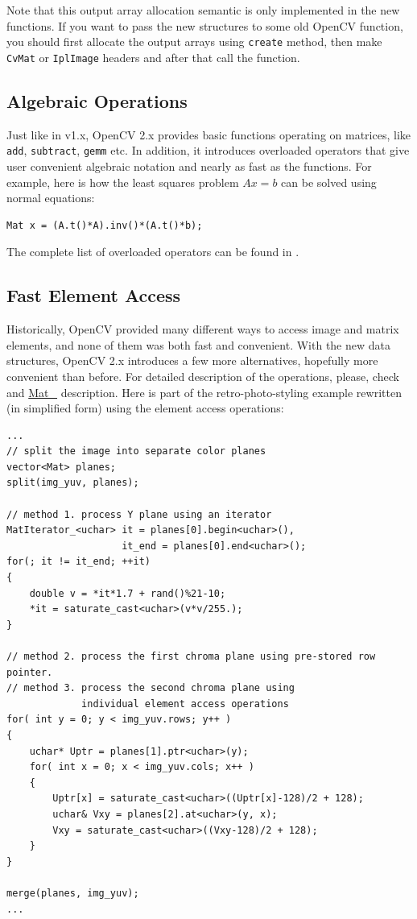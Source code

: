 Note that this output array allocation semantic is only implemented in the new functions. If you want to pass the new structures to some old OpenCV function, you should first allocate the output arrays using \texttt{create} method, then make \texttt{CvMat} or \texttt{IplImage} headers and after that call the function.

\subsection{Algebraic Operations}

Just like in v1.x, OpenCV 2.x provides basic functions operating on matrices, like \texttt{add},
\texttt{subtract}, \texttt{gemm} etc. In addition, it introduces overloaded operators that give user convenient
algebraic notation and nearly as fast as the functions. For example, here is how the least squares problem $Ax=b$
can be solved using normal equations:
\begin{lstlisting}
Mat x = (A.t()*A).inv()*(A.t()*b);
\end{lstlisting}

The complete list of overloaded operators can be found in .

\subsection{Fast Element Access}

Historically, OpenCV provided many different ways to access image and matrix elements, and none of them was both fast and convenient.
With the new data structures, OpenCV 2.x introduces a few more alternatives, hopefully more convenient than before. For detailed description of the operations, please, check  and \href{#MatT}{Mat\_} description. Here is part of the retro-photo-styling example rewritten (in simplified form) using the element access operations:

\begin{lstlisting}
...
// split the image into separate color planes
vector<Mat> planes;
split(img_yuv, planes);

// method 1. process Y plane using an iterator
MatIterator_<uchar> it = planes[0].begin<uchar>(),
                    it_end = planes[0].end<uchar>();
for(; it != it_end; ++it)
{
    double v = *it*1.7 + rand()%21-10;
    *it = saturate_cast<uchar>(v*v/255.);
}

// method 2. process the first chroma plane using pre-stored row pointer.
// method 3. process the second chroma plane using
             individual element access operations
for( int y = 0; y < img_yuv.rows; y++ )
{
    uchar* Uptr = planes[1].ptr<uchar>(y);
    for( int x = 0; x < img_yuv.cols; x++ )
    {
        Uptr[x] = saturate_cast<uchar>((Uptr[x]-128)/2 + 128);
        uchar& Vxy = planes[2].at<uchar>(y, x);
        Vxy = saturate_cast<uchar>((Vxy-128)/2 + 128);
    }
}

merge(planes, img_yuv);
...
\end{lstlisting}


